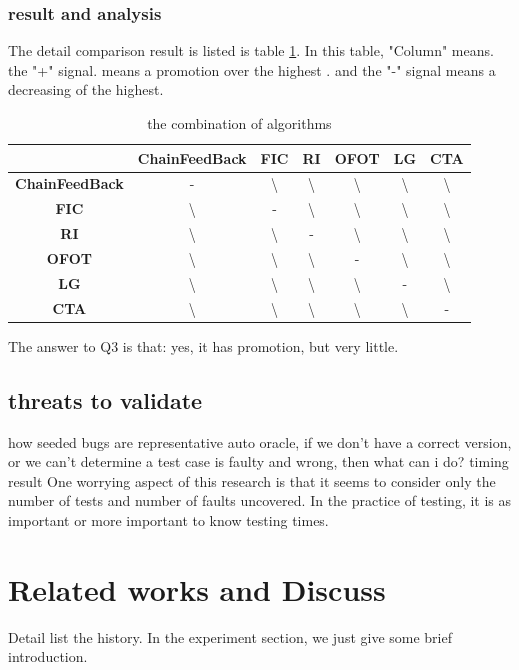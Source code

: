 \documentclass[10pt,journal,cspaper,compsoc]{IEEEtran}
\begin{document}
 \subsubsection{result and analysis}
 The detail comparison result is listed is table \ref{case-study3}. In this table, "Column" means. the "+" signal. means a promotion over the highest . and the "-" signal means a decreasing of the highest.
 \begin{table}\renewcommand{\arraystretch}{1.3}
  \caption{the combination of algorithms} \centering
  \label{case-study3}

  \begin{tabular}{c|c|c|c|c|c|c}
  \hline
   \ &  ChainFeedBack &   FIC   &  RI &  OFOT &  LG &  CTA\\
   \hline
   \bfseries ChainFeedBack & - & \textbackslash & \textbackslash & \textbackslash & \textbackslash & \textbackslash\\
   \bfseries FIC  & \textbackslash & - & \textbackslash & \textbackslash & \textbackslash & \textbackslash\\
   \bfseries  RI  & \textbackslash & \textbackslash & - & \textbackslash & \textbackslash & \textbackslash\\
   \bfseries OFOT  & \textbackslash & \textbackslash & \textbackslash & - & \textbackslash & \textbackslash\\
   \bfseries LG  & \textbackslash & \textbackslash & \textbackslash & \textbackslash & - & \textbackslash\\
   \bfseries CTA  & \textbackslash & \textbackslash & \textbackslash & \textbackslash & \textbackslash & -
  \end{tabular}
\end{table}

The answer to Q3 is that: yes, it has promotion, but very little.

\subsection{threats to validate}
how seeded bugs are representative
auto oracle, if we don't have a correct version, or we can't determine a test case is faulty and wrong, then what can i do?
timing result
One worrying aspect of this research is that it seems to consider only the number of tests and number of faults uncovered. In the practice of testing, it is as important or more important to know testing times.
\section{Related works and Discuss}\label{sec:related}
Detail list the history. In the experiment section, we just give some brief introduction.
\end{document}

